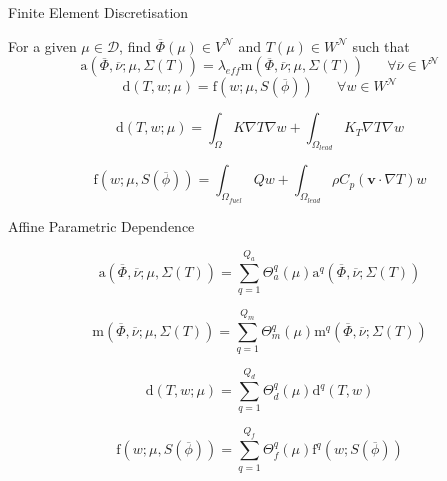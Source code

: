 \documentclass{beamer}
\renewcommand{\vec}[1]{\ensuremath{\overline{#1}}}
\newcommand{\vect}[1]{\ensuremath{\boldsymbol{#1}}}
\begin{document}
\begin{frame}{Finite Element Discretisation}
    \begin{block}{}
        For a given $\mu \in \mathcal{D}$, find $\vec{\Phi}(\mu) \in V^{\mathcal{N}}$ and $T(\mu) \in W^{\mathcal{N}}$ such that
        \[
        \mathrm{a}\left (\vec{\Phi},\vec{\nu}; \mu, \Sigma(T)\right ) = \lambda_{eff} \mathrm{m} \left (\vec{\Phi},\vec{\nu}; \mu, \Sigma(T)\right ) \mspace{30mu} \forall \vec{\nu} \in V^{\mathcal{N}}
        \]
        \[
        \mathrm{d}\left(T,w;\mu\right) = \mathrm{f}\left(w;\mu , S(\vec{\phi})\right) \mspace{30mu} \forall w \in W^{\mathcal{N}}
        \]
    \end{block}
    \begin{exampleblock}{}
        \begin{equation*}
            \mathrm{d}\left(T,w;\mu\right) = \int_{\Omega} K \nabla T \nabla w  + \int_{\Omega_{lead}}  K_T \nabla T \nabla w
        \end{equation*}
    \end{exampleblock}
    \begin{exampleblock}{}
        \begin{equation*}
            \mathrm{f}\left(w;\mu , S(\vec{\phi})\right) = \int_{\Omega_{fuel}} Q w + \int_{\Omega_{lead}} \rho C_p (\vect{v}\cdot \nabla T) w
        \end{equation*}
    \end{exampleblock}
\end{frame}

\begin{frame}{Affine Parametric Dependence}
    \begin{exampleblock}{}
        \begin{equation*}
            \mathrm{a}\left (\vec{\Phi},\vec{\nu}; \mu, \Sigma(T)\right ) = \sum_{q=1}^{Q_a} \Theta_a^q (\mu) \mathrm{a}^q\left (\vec{\Phi},\vec{\nu}; \Sigma(T)\right )
        \end{equation*}
    \end{exampleblock}
    \begin{exampleblock}{}
        \begin{equation*}
            \mathrm{m} \left (\vec{\Phi},\vec{\nu}; \mu, \Sigma(T)\right ) = \sum_{q=1}^{Q_m} \Theta_m^q (\mu) \mathrm{m}^q \left (\vec{\Phi},\vec{\nu}; \Sigma(T)\right )
        \end{equation*}
    \end{exampleblock}
    \begin{exampleblock}{}
        \begin{equation*}
            \mathrm{d}\left(T,w;\mu\right) = \sum_{q=1}^{Q_d} \Theta_d^q (\mu) \mathrm{d}^q \left(T,w\right)
        \end{equation*}
    \end{exampleblock}
    \begin{exampleblock}{}
        \begin{equation*}
            \mathrm{f}\left(w;\mu , S(\vec{\phi})\right) = \sum_{q=1}^{Q_f} \Theta_f^q (\mu) \mathrm{f}^q\left(w; S(\vec{\phi})\right)
        \end{equation*}
    \end{exampleblock}
\end{frame}
\end{document}
